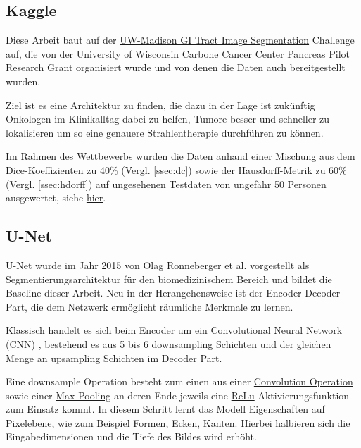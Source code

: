 \subsection{Kaggle} \label{ssec:kaggle}

Diese Arbeit baut auf der 
\href{https://www.kaggle.com/competitions/uw-madison-gi-tract-image-segmentation/overview/description}{UW-Madison GI Tract Image Segmentation}
Challenge auf, die von der University of Wisconsin Carbone Cancer Center Pancreas Pilot Research Grant organisiert wurde und von denen die Daten auch bereitgestellt wurden.

Ziel ist es eine Architektur zu finden, die dazu in der Lage ist zukünftig Onkologen im Klinikalltag dabei zu helfen, Tumore besser und schneller zu lokalisieren um so eine genauere Strahlentherapie durchführen zu können. 

Im Rahmen des Wettbewerbs wurden die Daten anhand einer Mischung aus dem Dice-Koeffizienten zu 40\% (Vergl. \ref{ssec:dc}) sowie der Hausdorff-Metrik zu 60\% (Vergl. \ref{ssec:hdorff}) auf ungesehenen Testdaten von ungefähr 50 Personen ausgewertet, siehe  \href{https://www.kaggle.com/competitions/uw-madison-gi-tract-image-segmentation/data}{hier}.

\subsection{U-Net}

U-Net wurde im Jahr 2015 von Olag Ronneberger et al. \citet{U-Net} vorgestellt als Segmentierungsarchitektur für den biomedizinischem Bereich und bildet die Baseline dieser Arbeit. Neu in der Herangehensweise ist der Encoder-Decoder Part, die dem Netzwerk ermöglicht räumliche Merkmale zu lernen.

Klassisch handelt es sich beim Encoder um ein
\href{https://en.wikipedia.org/wiki/Convolutional_neural_network}{Convolutional Neural Network} (CNN) , bestehend es aus 5 bis 6 downsampling Schichten und der gleichen Menge an  upsampling Schichten im Decoder Part. 

Eine downsample Operation besteht zum einen aus einer
\href{https://en.wikipedia.org/wiki/Convolution}{Convolution Operation}
sowie einer
\href{https://computersciencewiki.org/index.php/Max-pooling_/_Pooling}{Max Pooling}
an deren Ende jeweils eine
\href{https://deepai.org/machine-learning-glossary-and-terms/relu}{ReLu}
 Aktivierungsfunktion zum Einsatz kommt. In diesem Schritt lernt das Modell Eigenschaften auf Pixelebene, wie zum Beispiel Formen, Ecken, Kanten. Hierbei halbieren sich die Eingabedimensionen und die Tiefe des Bildes wird erhöht. 

